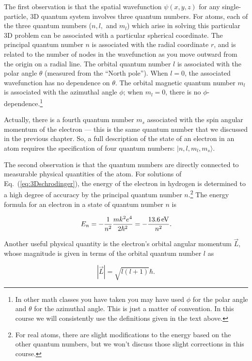The first observation is that the spatial wavefunction $\psi(x,y,z)$
for any single-particle, 3D quantum system involves three quantum
numbers.  For atoms, each of the three quantum numbers ($n, l,$ and
$m_l$) which arise in solving this particular 3D problem can be
associated with a particular spherical coordinate.  The principal
quantum number $n$ is associated with the radial coordinate $r$, and
is related to the number of nodes in the wavefunction as you move
outward from the origin on a radial line.  The orbital quantum number
$l$ is associated with the polar angle $\theta$ (measured from the
``North pole'').  When $l=0$, the associated wavefunction has no
dependence on $\theta$.  The orbital magnetic quantum number $m_l$ is
associated with the azimuthal angle $\phi$; when $m_l = 0$, there is
no $\phi$-dependence.\footnote{In other math classes you have taken
  you may have used $\phi$ for the polar angle and $\theta$ for the
  azimuthal angle.  This is just a matter of convention. In this
  course we will consistently use the definitions given in the text
  above.}

Actually, there is a fourth quantum number $m_s$ associated with the
spin angular momentum of the electron --- this is the same quantum
number that we discussed in the previous chapter.  So, a full
description of the state of an electron in an atom requires the
specification of four quantum numbers: $|n,l,m_l,m_s\rangle$.

The second observation is that the quantum numbers are directly
connected to measurable physical quantities of the atom.  For
solutions of Eq.~(\ref{eq:3Dschrodinger}), the energy of the electron
in hydrogen is determined to a high degree of accuracy by the
principal quantum number $n$.\footnote{For real atoms, there are
  slight modifications to the energy based on the other quantum
  numbers, but we won't discuss those slight corrections in this
  course.}  The energy formula for an electron in a state of quantum
number $n$ is

\begin{equation}
\label{eq:hydrogenE}
E_n = -\frac{1}{n^2} \frac{m k^2 e^4}{2 \hbar^2} 
= - \frac{13.6 \,\mbox{eV}}{n^2}  .
\end{equation}

Another useful physical quantity is the electron's orbital angular
momentum $\vec{L}$, whose magnitude is given in terms of the orbital
quantum number $l$ as

\begin{equation}
\label{eq:Lmag}
|\vec{L}| = \sqrt{l (l + 1)} \hbar  .
\end{equation}

